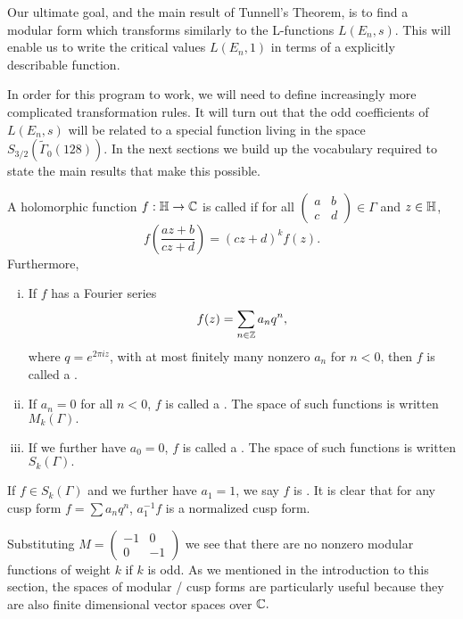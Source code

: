 \documentclass[12pt, a4paper]{amsart}
\begin{document}
Our ultimate goal, and the main result of Tunnell's Theorem, is to
find a modular form which transforms similarly to the L-functions $L(E_n,s)$.
This will enable us to write the critical values $L(E_n,1)$ in terms of a
explicitly describable function.  

In order for this program to work, we will need to define increasingly more
complicated transformation rules. It will turn out that the odd coefficients of
$L(E_n,s)$ will be
related to a special function living in the space
$S_{3/2}(\tilde{\Gamma}_0(128)).$ In the next sections we build up the
vocabulary required to state the main results that make this possible.

\begin{defn}
  A holomorphic function $f : \mathbb{H} \rightarrow {\mathbb C}$ is called  if for all $\left(
    \begin{smallmatrix}
      a & b \\ c & d
    \end{smallmatrix}
  \right) \in \Gamma$ and $z \in \mathbb{H}$,
  \[f \left( \frac{az+b}{cz+d} \right) = (cz+d)^k f(z). \]
  Furthermore,
  \begin{enumerate}[(i)]
  \item If $f$ has a Fourier series $$f(z) = \sum\limits_{n \in {\mathbb Z}} a_n q^n,$$
    where $q = e^{2\pi i z}$, with at most finitely many nonzero $a_n$ for $n <
    0$, then $f$ is called a . 
  \item If $a_n = 0$ for all $n < 0$, $f$ is called a . The space of such functions is written $M_k(\Gamma).$
  \item If we further have $a_0 = 0$, $f$ is called a . The space of such functions is written $S_k(\Gamma).$
  \end{enumerate}
\end{defn}

\begin{remark}
  If $f \in S_k(\Gamma)$ and we further have $a_1 = 1$, we say $f$ is
  . It is clear that for any cusp form $f = \sum a_n q^n$,
  $a_1^{-1}f$ is a normalized cusp form.
\end{remark}

Substituting
$M = \left(
  \begin{smallmatrix}
    -1 & 0 \\ 0 & -1
  \end{smallmatrix}
\right)
$ we see that there are no
nonzero modular functions of weight $k$ if $k$ is odd.
As we mentioned in the introduction to this section, the spaces of modular /
cusp forms are particularly useful because they are also finite dimensional
vector spaces over ${\mathbb C}.$
\end{document}
